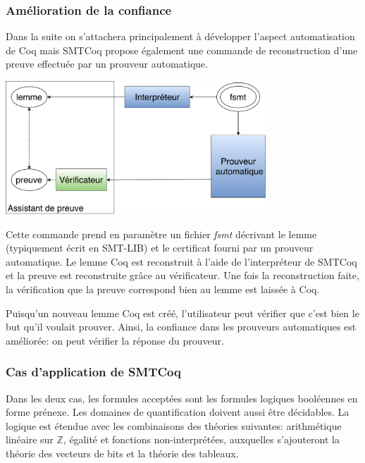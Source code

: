 \documentclass[11pt]{article}
\begin{document}
\subsubsection{Amélioration de la confiance} \label{confiance}

Dans la suite on s'attachera principalement à développer l'aspect automatisation de Coq mais SMTCoq propose également une commande de reconstruction d'une preuve effectuée par un prouveur automatique.

\begin{center}
\includegraphics[height=5cm]{Confiance.pdf}
\end{center}

Cette commande prend en paramètre un fichier \textit{fsmt} décrivant le lemme (typiquement écrit en SMT-LIB) et le certificat fourni par un prouveur automatique. Le lemme Coq est reconstruit à l'aide de l'interpréteur de SMTCoq et la preuve est reconstruite grâce au vérificateur. Une fois la reconstruction faite, la vérification que la preuve correspond bien au lemme est laissée à Coq. \medbreak

Puisqu'un nouveau lemme Coq est créé, l'utilisateur peut vérifier que c'est bien le but qu'il voulait prouver. Ainsi, la confiance dans les prouveurs automatiques est améliorée: on peut vérifier la réponse du prouveur.


\subsubsection{Cas d'application de SMTCoq} \label{cas_application}

Dans les deux cas, les formules acceptées sont les formules logiques booléennes en forme prénexe. Les domaines de quantification doivent aussi être décidables. La logique est étendue avec les combinaisons des théories suivantes: arithmétique linéaire sur $\mathbb{Z}$, égalité et fonctions non-interprétées, auxquelles s'ajouteront la théorie des vecteurs de bits et la théorie des tableaux. 
\end{document}
